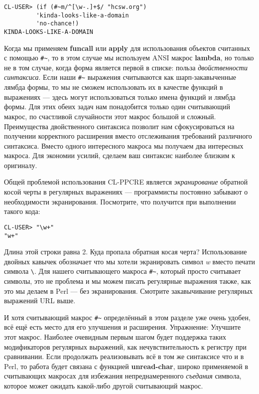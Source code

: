 \begin{verbatim}
CL-USER> (if (#~m/^[\w-.]+$/ "hcsw.org")
	     'kinda-looks-like-a-domain
	     'no-chance!)
KINDA-LOOKS-LIKE-A-DOMAIN
\end{verbatim}

Когда мы применяем \textbf{funcall} или \textbf{apply} для использования объектов считанных с помощью \verb"#~", то в этом случае мы используем ANSI макрос \textbf{lambda}, но только не в том случае, когда форма является первой в списке: польза \emph{двойственности синтаксиса}. Если наши \verb"#~" выражения считываются как шарп-закавыченные лямбда формы, то мы не сможем использовать их в качестве функций в выражениях --- здесь могут использоваться только имена функций и лямбда формы. Для этих обеих задач нам понадобится только один считывающий макрос, по счастливой случайности этот макрос большой и сложный. Преимущества двойственного синтаксиса позволит нам сфокусироваться на получении корректного расширения вместо отслеживания требований различного синтаксиса. Вместо одного интересного макроса мы получаем два интересных макроса. Для экономии усилий, сделаем ваш синтаксис наиболее близким к оригиналу.

Общей проблемой использования CL-PPCRE является \emph{экранирование} обратной косой черты в регулярных выражениях --- программисты постоянно забывают о необходимости экранирования. Посмотрите, что получится при выполнении такого кода:

\begin{verbatim}
CL-USER> "\w+"
"w+"
\end{verbatim}

Длина этой строки равна 2. Куда пропала обратная косая черта? Использование двойных кавычек обозначает что мы хотели экранировать символ \emph{w} вместо печати символа \verb"\". Для нашего считывающего макроса \verb"#~", который просто считывает символы, это не проблема и мы можем писать регулярные выражения также, как это мы делаем в Perl --- без экранирования. Смотрите закавычивание регулярных выражений URL выше.

И хотя считывающий макрос \verb"#~" определённый в этом разделе уже очень удобен, всё ещё есть место для его улучшения и расширения. Упражнение: Улучшите этот макрос. Наиболее очевидным первым шагом будет поддержка таких модификаторов регулярных выражений, как нечувствительность к регистру при сравнивании. Если продолжать реализовывать всё в том же синтаксисе что и в Perl, то работа будет связана с функцией \textbf{unread-char}, широко применяемой в считывающих макросах для избежания непреднамеренного \emph{съедания} символа, которое может ожидать какой-либо другой считывающий макрос.

